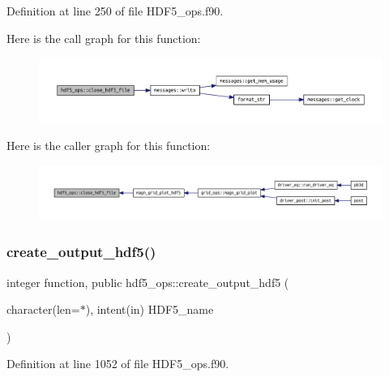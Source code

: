 Definition at line 250 of file H\+D\+F5\+\_\+ops.\+f90.

Here is the call graph for this function\+:
\nopagebreak
\begin{figure}[H]
\begin{center}
\leavevmode
\includegraphics[width=350pt]{namespacehdf5__ops_ad6c53fff55bd71f63470ca1e525ddb56_cgraph}
\end{center}
\end{figure}
Here is the caller graph for this function\+:
\nopagebreak
\begin{figure}[H]
\begin{center}
\leavevmode
\includegraphics[width=350pt]{namespacehdf5__ops_ad6c53fff55bd71f63470ca1e525ddb56_icgraph}
\end{center}
\end{figure}
\mbox{\label{namespacehdf5__ops_a1263636fffc4f4aa86f72bd5fd3352a0}} 
\subsubsection{\texorpdfstring{create\+\_\+output\+\_\+hdf5()}{create\_output\_hdf5()}}
{\footnotesize\ttfamily integer function, public hdf5\+\_\+ops\+::create\+\_\+output\+\_\+hdf5 (\begin{DoxyParamCaption}\item[{character(len=$\ast$), intent(in)}]{H\+D\+F5\+\_\+name }\end{DoxyParamCaption})}



Definition at line 1052 of file H\+D\+F5\+\_\+ops.\+f90.

